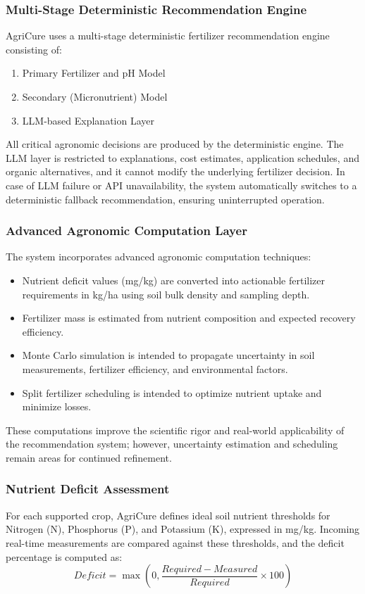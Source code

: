 \documentclass[conference]{IEEEtran}
\begin{document}
\subsubsection{Multi-Stage Deterministic Recommendation Engine}
AgriCure uses a multi-stage deterministic fertilizer recommendation engine consisting of:
\begin{enumerate}
\item Primary Fertilizer and pH Model
\item Secondary (Micronutrient) Model
\item LLM-based Explanation Layer
\end{enumerate}
All critical agronomic decisions are produced by the deterministic engine. The LLM layer is restricted to explanations, cost estimates, application schedules, and organic alternatives, and it cannot modify the underlying fertilizer decision. In case of LLM failure or API unavailability, the system automatically switches to a deterministic fallback recommendation, ensuring uninterrupted operation.

\subsubsection{Advanced Agronomic Computation Layer}
The system incorporates advanced agronomic computation techniques:
\begin{itemize}
\item Nutrient deficit values (mg/kg) are converted into actionable fertilizer requirements in kg/ha using soil bulk density and sampling depth.
\item Fertilizer mass is estimated from nutrient composition and expected recovery efficiency.
\item Monte Carlo simulation is intended to propagate uncertainty in soil measurements, fertilizer efficiency, and environmental factors.
\item Split fertilizer scheduling is intended to optimize nutrient uptake and minimize losses.
\end{itemize}
These computations improve the scientific rigor and real-world applicability of the recommendation system; however, uncertainty estimation and scheduling remain areas for continued refinement.

\subsubsection{Nutrient Deficit Assessment}
For each supported crop, AgriCure defines ideal soil nutrient thresholds for Nitrogen (N), Phosphorus (P), and Potassium (K), expressed in mg/kg. Incoming real-time measurements are compared against these thresholds, and the deficit percentage is computed as:
\begin{equation}
Deficit = \max \left(0, \frac{Required - Measured}{Required} \times 100 \right)
\end{equation}
\end{document}
